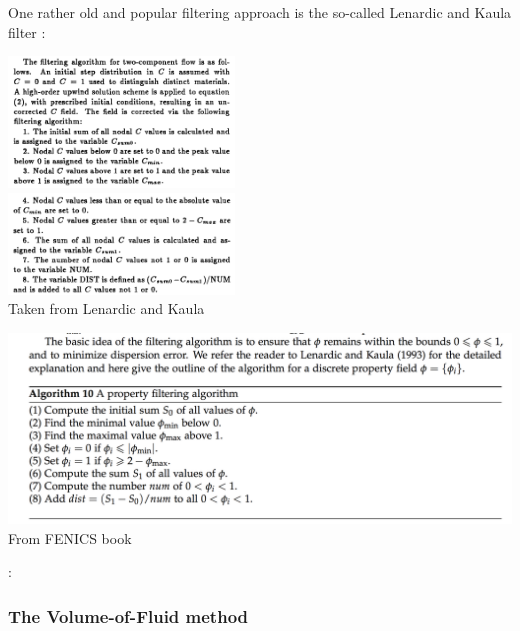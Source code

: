 One rather old and popular filtering approach is the so-called Lenardic and Kaula filter \cite{leka93}:

\begin{center}
\includegraphics[width=6cm]{images/compositions/leka93_filter1}\\
\includegraphics[width=6cm]{images/compositions/leka93_filter2}\\
{\small Taken from Lenardic and Kaula \cite{leka93}}
\end{center}

\begin{center}
\includegraphics[width=16cm]{images/compositions/leka93_filter3}\\
{\small From FENICS book}
\end{center}

\Literature: \cite{vyrc13}







\subsubsection{The Volume-of-Fluid method}

\cite{hini81}

